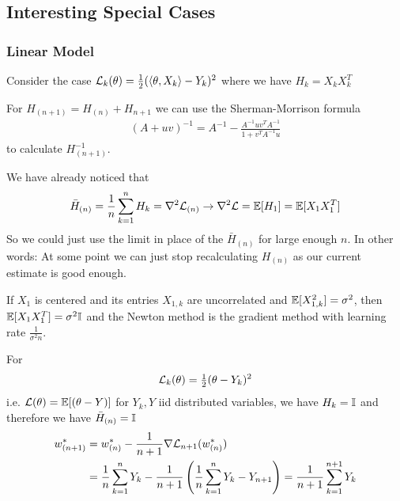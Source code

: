 \subsection{Interesting Special Cases}

\subsubsection{Linear Model}

Consider the case \(\mathcal{L}_k(\theta) = \tfrac12(\langle \theta, X_k\rangle - Y_k)^2\)
where we have \(H_k = X_k X_k^T\)

\begin{example}
	For \(H_{(n+1)} = H_{(n)} + H_{n+1}\) we can use the Sherman-Morrison formula
	\begin{align*}
		(A + uv)^{-1} = A^{-1} - \frac{A^{-1}uv^T A^{-1}}{1+ v^T A^{-1}u}
	\end{align*}
	to calculate \(H_{(n+1)}^{-1}\).
\end{example}

\begin{example}
	We have already noticed that
	\begin{align*}
		\bar{H}_{(n)} = \frac1n\sum_{k=1}^n H_k = \nabla^2\mathcal{L}_{(n)}
		\to \nabla^2\mathcal{L} = \mathbb{E}[H_1]=\mathbb{E}[X_1X_1^T]
	\end{align*}
	So we could just use the limit in place of the \(\bar{H}_{(n)}\) for large
	enough \(n\). In other words: At some point we can just stop recalculating
	\(H_{(n)}\) as our current estimate is good enough.
\end{example}

\begin{example}
	If \(X_1\) is centered and its entries \(X_{1,k}\) are uncorrelated and
	\(\mathbb{E}[X_{1,k}^2]=\sigma^2\), then \(\mathbb{E}[X_1X_1^T]=\sigma^2\mathbb{I}\) and
	the Newton method is the gradient method with learning rate
	\(\frac{1}{\sigma^2n}\). 
\end{example}

\begin{example}
	For
	\begin{align}
		\mathcal{L}_k(\theta) = \tfrac12(\theta - Y_k)^2
	\end{align}	
	i.e. \(\mathcal{L}(\theta) = \mathbb{E}[(\theta - Y)]\) for \(Y_k, Y\) iid distributed
	variables, we have \(H_k = \mathbb{I}\) and therefore we have \(\bar{H}_{(n)}=\mathbb{I}\)
	\begin{align*}
		w^*_{(n+1)}
		&= w^*_{(n)} - \frac1{n+1}\nabla\mathcal{L}_{n+1}(w^*_{(n)})\\
		&= \frac1n\sum_{k=1}^n Y_k - \frac1{n+1}\left(\frac1n\sum_{k=1}^n Y_k - Y_{n+1}\right)
		= \frac1{n+1}\sum_{k=1}^{n+1} Y_k
	\end{align*}
\end{example}